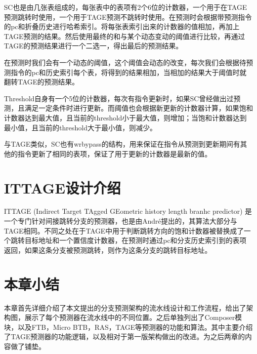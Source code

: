 SC也是由几张表组成的，每张表中的表项有2个6位的计数器，一个用于在TAGE预测跳转时使用，一个用于TAGE预测不跳转时使用。在预测时会根据带预测指令的pc和折叠历史进行哈希索引。将每张表索引出来的计数器的值相加，再加上TAGE预测的结果。然后使用最终的和与某个动态变动的阈值进行比较，再通过TAGE的预测结果进行一个二选一，得出最后的预测结果。

在预测时我们会有一个动态的阈值，这个阈值会动态的改变，每次我们会根据待预测指令的pc和历史索引每个表，将得到的结果相加，当相加的结果大于阈值时就翻转TAGE的预测结果。

Threshold自身有一个5位的计数器，每次有指令更新时，如果SC曾经做出过预测，且满足一定条件时进行更新。而阈值也会根据新更新的计数器计算，如果饱和计数器达到最大值，且当前的threshold小于最大值，则增加；当饱和计数器达到最小值，且当前的threshold大于最小值，则减少。


与TAGE类似，SC也有wrbypass的结构，用来保证在指令从预测到更新期间有其他的指令更新了相同的表项，保证了用于更新的计数器是最新的值。


\section{ITTAGE设计介绍}

ITTAGE (Indirect Target TAgged GEometric history length branhc predictor)\cite{tage, ittage} 是一个专门针对间接跳转分支的预测器，也是由André提出的，其算法大部分与TAGE相同。不同之处在于TAGE中用于判断跳转方向的饱和计数器被替换成了一个跳转目标地址和一个置信度计数器，在预测时通过pc和分支历史索引到的表项返回，如果这条分支被预测跳转，则作为这条分支的跳转目标地址。

\section{本章小结}

本章首先详细介绍了本文提出的分支预测架构的流水线设计和工作流程，给出了架构图，展示了每个预测器在流水线中的不同位置。之后单独列出了Composer模块，以及FTB，Micro BTB，RAS，TAGE等预测器的功能和算法。其中主要介绍了TAGE预测器的功能逻辑，以及相对于第一版架构做出的改进。为之后两章的内容做了铺垫。
